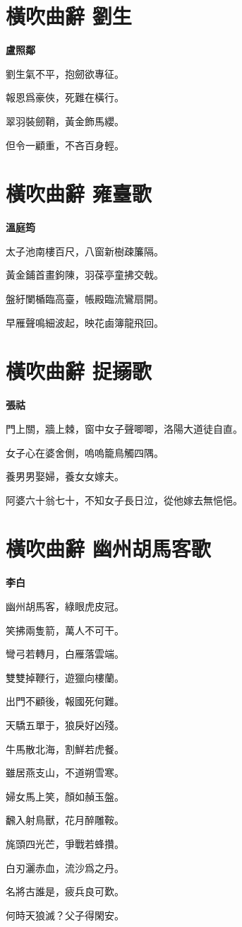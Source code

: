 \documentclass[12pt,a4paper]{ctexbook}
\begin{document}
\section{橫吹曲辭 劉生}
\textbf{盧照鄰}\par\vspace{0.5em}
劉生氣不平，抱劒欲專征。\par
報恩爲豪俠，死難在橫行。\par
翠羽裝劒鞘，黃金飾馬纓。\par
但令一顧重，不吝百身輕。\par

\section{橫吹曲辭 雍臺歌}
\textbf{溫庭筠}\par\vspace{0.5em}
太子池南樓百尺，八窗新樹疎簾隔。\par
黃金鋪首畫鉤陳，羽葆亭童拂交戟。\par
盤紆闌楯臨高臺，帳殿臨流鸞扇開。\par
早雁聲鳴細波起，映花鹵簿龍飛回。\par

\section{橫吹曲辭 捉搦歌}
\textbf{張祜}\par\vspace{0.5em}
門上關，牆上棘，窗中女子聲唧唧，洛陽大道徒自直。\par
女子心在婆舍側，嗚嗚籠鳥觸四隅。\par
養男男娶婦，養女女嫁夫。\par
阿婆六十翁七十，不知女子長日泣，從他嫁去無悒悒。\par

\section{橫吹曲辭 幽州胡馬客歌}
\textbf{李白}\par\vspace{0.5em}
幽州胡馬客，綠眼虎皮冠。\par
笑拂兩隻箭，萬人不可干。\par
彎弓若轉月，白雁落雲端。\par
雙雙掉鞭行，遊獵向樓蘭。\par
出門不顧後，報國死何難。\par
天驕五單于，狼戾好凶殘。\par
牛馬散北海，割鮮若虎餐。\par
雖居燕支山，不道朔雪寒。\par
婦女馬上笑，顏如赬玉盤。\par
飜入射鳥獸，花月醉雕鞍。\par
旄頭四光芒，爭戰若蜂攢。\par
白刃灑赤血，流沙爲之丹。\par
名將古誰是，疲兵良可歎。\par
何時天狼滅？父子得閑安。\par
\end{document}
